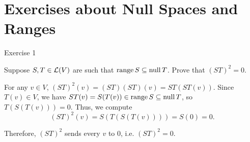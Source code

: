 \section*{Exercises about Null Spaces and Ranges}

\begin{xrcs}
  Exercise 1
\end{xrcs}

\begin{xrcs}
  Suppose $S, T \in \mathcal{L}(V)$ are such that $\operatorname{range} S \subseteq \operatorname{null} T$. Prove that $(ST)^2 = 0$.
  \begin{xprf}
    For any $v \in V$, $(ST)^2 (v) = (ST)(ST) (v) = ST (ST(v))$. Since $T(v) \in V$, we have $ST(v) = S(T(v)) \in \operatorname{range} S \subseteq \operatorname{null} T$, so $T(S(T(v)))=0$. Thus, we compute
    \begin{equation}
      (ST)^2 (v) = S(T(S(T(v)))) = S(0) = 0.
    \end{equation}

    Therefore, $(ST)^2$ sends every $v$ to $0$, i.e. $(ST)^2 = 0$.
  \end{xprf}
\end{xrcs}


\setcounter{xrcscount}{8}
%

